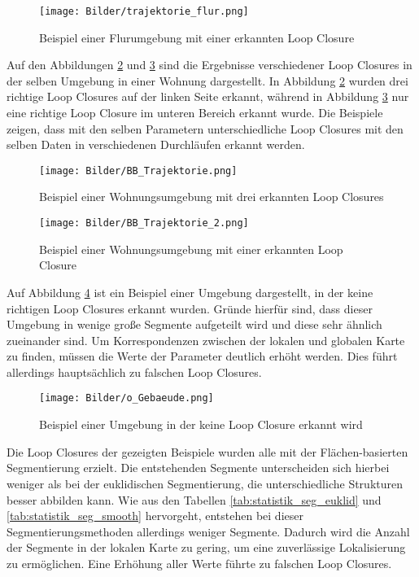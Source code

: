 \begin{figure}
	\centering
	\texttt{[image: Bilder/trajektorie\_flur.png]}
	\caption{Beispiel einer Flurumgebung mit einer erkannten Loop Closure}
	\label{fig:vgl_trajektorie_match_flur}
\end{figure}

Auf den Abbildungen \ref{fig:vgl_trajektorie_bb_3lc} und  \ref{fig:vgl_trajektorie_bb_1lc} sind die Ergebnisse verschiedener Loop Closures in der selben Umgebung in einer Wohnung dargestellt. In Abbildung \ref{fig:vgl_trajektorie_bb_3lc} wurden drei richtige Loop Closures auf der linken Seite erkannt, während in Abbildung \ref{fig:vgl_trajektorie_bb_1lc} nur eine richtige Loop Closure im unteren Bereich erkannt wurde. Die Beispiele zeigen, dass mit den selben Parametern unterschiedliche Loop Closures mit den selben Daten in verschiedenen Durchläufen erkannt werden. 

\begin{figure}
	\centering
	\texttt{[image: Bilder/BB\_Trajektorie.png]}
	\caption{Beispiel einer Wohnungsumgebung mit drei erkannten Loop Closures}
	\label{fig:vgl_trajektorie_bb_3lc}
\end{figure}

\begin{figure}
	\centering
	\texttt{[image: Bilder/BB\_Trajektorie\_2.png]}
	\caption{Beispiel einer Wohnungsumgebung mit einer erkannten Loop Closure}
	\label{fig:vgl_trajektorie_bb_1lc}
\end{figure}

Auf Abbildung \ref{fig:OGebäude} ist ein Beispiel einer Umgebung dargestellt, in der keine richtigen Loop Closures erkannt wurden. Gründe hierfür sind, dass dieser Umgebung in wenige große Segmente aufgeteilt wird und diese sehr ähnlich zueinander sind. Um Korrespondenzen zwischen der lokalen und globalen Karte zu finden, müssen die Werte der Parameter deutlich erhöht werden. Dies führt allerdings hauptsächlich zu falschen Loop Closures. 

\begin{figure}
	\centering
	\texttt{[image: Bilder/o\_Gebaeude.png]}
	\caption{Beispiel einer Umgebung in der keine Loop Closure erkannt wird}
	\label{fig:OGebäude}
\end{figure}

Die Loop Closures der gezeigten Beispiele wurden alle mit der Flächen-basierten Segmentierung erzielt. Die entstehenden Segmente unterscheiden sich hierbei weniger als bei der euklidischen Segmentierung, die unterschiedliche Strukturen besser abbilden kann. Wie aus den Tabellen \ref{tab:statistik_seg_euklid} und \ref{tab:statistik_seg_smooth} hervorgeht, entstehen bei dieser Segmentierungsmethoden allerdings weniger Segmente. Dadurch wird die Anzahl der Segmente in der lokalen Karte zu gering, um eine zuverlässige Lokalisierung zu ermöglichen. Eine Erhöhung aller Werte führte zu falschen Loop Closures. 